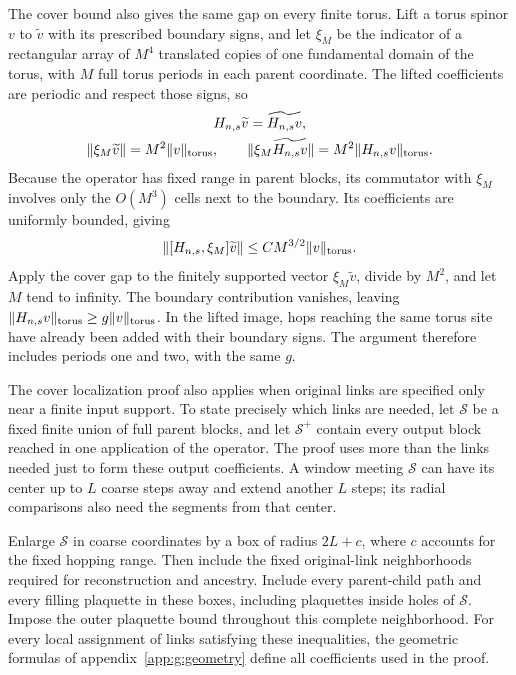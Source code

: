 \documentclass[11pt,a4paper]{article}
\theoremstyle{remark}
\begin{document}
The cover bound also gives the same gap on every finite torus.
Lift a torus spinor $v$ to $\widetilde v$ with its prescribed
boundary signs, and let $\xi_M$ be the indicator of a rectangular
array of $M^4$ translated copies of one fundamental domain of the
torus, with $M$ full torus periods in each parent coordinate.
The lifted coefficients are periodic and respect those
signs, so
\begin{equation}
 \begin{gathered}
 H_{n,s}\widetilde v=\widetilde{H_{n,s}v},\\
 \|\xi_M\widetilde v\|=M^2\|v\|_{\rm torus},\qquad
 \|\xi_M\widetilde{H_{n,s}v}\|
       =M^2\|H_{n,s}v\|_{\rm torus}.
 \end{gathered}
\end{equation}
Because the operator has fixed range in parent blocks, its commutator
with $\xi_M$ involves only the $O(M^3)$ cells next to the boundary.
Its coefficients are uniformly bounded, giving
\begin{equation}
 \|[H_{n,s},\xi_M]\widetilde v\|
       \le C M^{3/2}\|v\|_{\rm torus}.
\end{equation}
Apply the cover gap to the finitely supported vector
$\xi_M\widetilde v$, divide by $M^2$, and let $M$ tend to infinity.
The boundary contribution vanishes, leaving
$\|H_{n,s}v\|_{\rm torus}\ge g\|v\|_{\rm torus}$.
In the lifted image, hops reaching the same torus site have already
been added with their boundary signs. The argument therefore includes
periods one and two, with the same $g$.

The cover localization proof also applies when original links are
specified only near a finite input support. To state precisely which
links are needed, let
$\mathcal S$ be a fixed finite union of full parent blocks, and let
$\mathcal S^+$ contain every output block reached in one application
of the operator. The proof uses more than the links needed just to form
these output coefficients. A window meeting $\mathcal S$ can have
its center up to $L$ coarse steps away and extend another $L$ steps;
its radial comparisons also need the segments from that center.

Enlarge $\mathcal S$ in coarse coordinates by a box of radius
$2L+c$, where $c$ accounts for the fixed hopping range. Then include
the fixed original-link neighborhoods required for reconstruction and
ancestry. Include every parent-child path and every filling plaquette
in these boxes, including plaquettes inside holes of $\mathcal S$.
Impose the outer plaquette bound throughout this complete neighborhood.
For every local assignment of links satisfying these inequalities,
the geometric formulas of appendix~\ref{app:g:geometry} define all
coefficients used in the proof.
\end{document}
